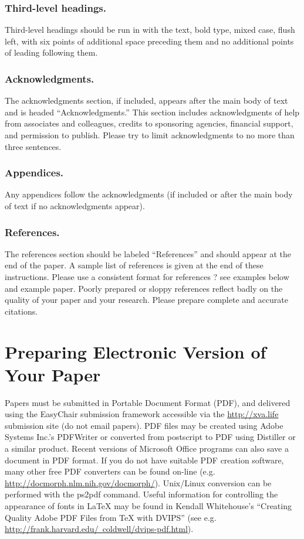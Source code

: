 \documentclass[letterpaper]{article}
\begin{document}
\subsubsection{Third-level headings.}
Third-level headings should be run in with the text, bold type, mixed case, 
flush left, with six points of additional space preceding them and no 
additional points of leading following them.

\subsubsection{Acknowledgments.} 
The acknowledgments section, if included, appears after the main body 
of text and is headed ``Acknowledgments.'' This section includes 
acknowledgments of help from associates and colleagues, credits 
to sponsoring agencies, financial support, and permission to publish. 
Please try to limit acknowledgments to no more than three sentences.

\subsubsection{Appendices.} 
Any appendices follow the acknowledgments (if included or after the 
main body of text if no acknowledgments appear).

\subsubsection{References.} 
The references section should be labeled ``References'' and should 
appear at the end of the paper. A sample list of references is given 
at the end of these instructions. Please use a consistent format for 
references ? see examples below and example paper. Poorly prepared or 
sloppy references reflect badly on the quality of your paper and your 
research. Please prepare complete and accurate citations. 

\section{Preparing Electronic Version of Your Paper}
Papers must be submitted in Portable Document Format (PDF), and delivered 
using the EasyChair submission framework accessible via the 
\href{url}{http://xva.life}
submission site (do not email papers). PDF files may be created using Adobe 
Systems Inc.'s PDFWriter or converted from postscript to PDF using Distiller 
or a similar product. Recent versions of Microsoft Office programs can also 
save a document in PDF format. If you do not have suitable PDF creation software,
many other free PDF converters can be found on-line (e.g. 
\href{url}{http://docmorph.nlm.nih.gov/docmorph/}). 
Unix/Linux conversion can be performed with the ps2pdf command.
Useful information for controlling the appearance of fonts in LaTeX may 
be found in Kendall Whitehouse's ``Creating Quality Adobe PDF Files from 
TeX with DVIPS'' (see 
e.g. \href{url}{http://frank.harvard.edu/~coldwell/dvips-pdf.html}).
\end{document}
